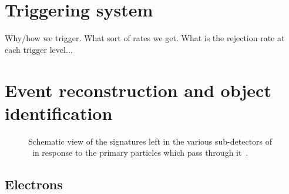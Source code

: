 \FloatBarrier
\section{Triggering system}

{\color{red} Why/how we trigger. What sort of rates we get. What is the
rejection rate at each trigger level...}

\FloatBarrier
\section{Event reconstruction and object identification}
\label{sec:event_reco}

\begin{figure}[ht]
  \caption{
    Schematic view of the signatures left in the various sub-detectors of
    \atlas\ in response to the primary particles which pass through
    it~\cite{Pequenao:1505342}.
  }
  \label{fig:particle_signatures}
\end{figure}

\FloatBarrier
\subsection{Electrons} 
\label{sec:elctrons}


